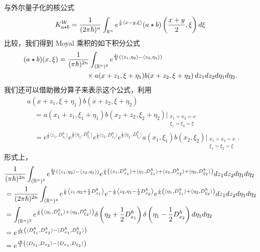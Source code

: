 与外尔量子化的核公式
\[
  K_{a\star b}^W=\frac{1}{(2\pi\hbar)^{n}}\int_{\mathbb{R}^n}
  e^{\frac{i}{\hbar}\langle x-y,\xi\rangle}(a\star b)\left(\frac{x+y}{2},\xi\right)d\xi
\]
比较，我们得到 Moyal 乘积的如下积分公式
\[
  \begin{aligned}
    (a\star b)(x,\xi)
    &=\frac{1}{(\pi\hbar)^{2n}}\int_{(\mathbb{R}^n)^4}
      e^{\frac{2i}{\hbar}\left(\langle z_1,\eta_2\rangle-\langle z_2,\eta_1\rangle\right)}\\
    &\qquad\qquad\times
      a(x+z_1,\xi+\eta_1)b(x+z_2,\xi+\eta_2)\,dz_1dz_2d\eta_1d\eta_2.
  \end{aligned}
\]
我们还可以借助微分算子来表示这个公式，利用
\begin{align*}
  &a(x+z_1,\xi+\eta_1)b(x+z_2,\xi+\eta_2)\\
  &\quad=a(x_1+z_1,\xi_1+\eta_1)b(x_2+z_2,\xi_2+\eta_2)\Big|_{\substack{x_1=x_2=x\\ \xi_1=\xi_2=\xi}}\\
  &\quad=e^{\frac{i}{\hbar}\langle z_1,D_{x_1}^\hbar\rangle}
    e^{\frac{i}{\hbar}\langle\eta_1,D_{\xi_1}^\hbar\rangle}
    e^{\frac{i}{\hbar}\langle z_2,D_{x_2}^\hbar\rangle}
    e^{\frac{i}{\hbar}\langle\eta_2,D_{\xi_2}^\hbar\rangle}
    a(x_1,\xi_1)b(x_2,\xi_2)\Big|_{\substack{x_1=x_2=x\\ \xi_1=\xi_2=\xi}}.
\end{align*}
形式上，
\begin{align*}
  &\frac{1}{(\pi\hbar)^{2n}}\int_{(\mathbb{R}^n)^4}
    e^{\frac{2i}{\hbar}\left(\langle z_1,\eta_2\rangle-\langle z_2,\eta_1\rangle\right)}
    e^{\frac{i}{\hbar}\left(\langle z_1,D_{x_1}^\hbar\rangle
      +\langle\eta_1,D_{\xi_1}^\hbar\rangle
      +\langle z_2,D_{x_2}^\hbar\rangle
      +\langle\eta_2,D_{\xi_2}^\hbar\rangle\right)}
    dz_1dz_2d\eta_1d\eta_2\\
  &=\frac{1}{(2\pi\hbar)^{2n}}\int_{(\mathbb{R}^n)^4}
    e^{\frac{i}{\hbar}\left\langle z_1,\eta_2+\frac{1}{2}D_{x_1}^\hbar\right\rangle}
    e^{-\frac{i}{\hbar}\left\langle z_2,\eta_1-\frac{1}{2}D_{x_2}^\hbar\right\rangle}
    e^{\frac{i}{\hbar}\left(\langle\eta_1,D_{\xi_1}^\hbar\rangle
      +\langle\eta_2,D_{\xi_2}^\hbar\rangle\right)}
    dz_1dz_2d\eta_1d\eta_2\\
  &=\int_{(\mathbb{R}^n)^2}
    e^{\frac{i}{\hbar}\left(\langle\eta_1,D_{\xi_1}^\hbar\rangle
      +\langle\eta_2,D_{\xi_2}^\hbar\rangle\right)}
    \delta\left(\eta_2+\frac{1}{2}D_{x_1}^\hbar\right)
    \delta\left(\eta_1-\frac{1}{2}D_{x_2}^\hbar\right)d\eta_1d\eta_2\\
  &=e^{\frac{i}{2\hbar}\left(\langle D_{\xi_1}^\hbar,D_{x_2}^\hbar\rangle
    -\langle D_{x_1}^\hbar,D_{\xi_2}^\hbar\rangle\right)}\\
  &=e^{\frac{i\hbar}{2}\left(\langle D_{\xi_1},D_{x_2}\rangle
    -\langle D_{x_1},D_{\xi_2}\rangle\right)}
\end{align*}

